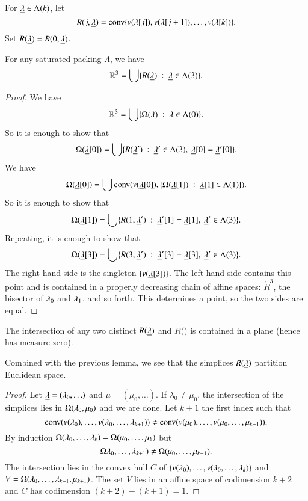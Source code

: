For ${\underline{\lambda}}\in\Lambda(k)$, let 
$$R(j,{\underline{\lambda}}) = {\operatorname{conv}}\{v(\lambda[j]), v(\lambda[j+1]),\ldots,v(\lambda[k])\}.$$  Set $R({\underline{\lambda}})=R(0,{\underline{\lambda}})$.


\begin{lemma} 
For any saturated packing $\Lambda$, we have
$$\mathbb{R}^3 = \bigcup \{ R({\underline{\lambda}}) \ :\  {\underline{\lambda}}\in \Lambda(3)\}.$$
\end{lemma}

\begin{proof}
We have $$\mathbb{R}^3 = \bigcup \{\Omega(\lambda)\ :\  \lambda\in \Lambda(0)\}.$$
So it is enough to show that
$$\Omega({\underline{\lambda}}[0]) = \bigcup \{ R({\underline{\lambda}}') \ :\  {\underline{\lambda}}'\in \Lambda(3),~{\underline{\lambda}}[0]={\underline{\lambda}}'[0]\}.$$
We have
$$\Omega({\underline{\lambda}}[0]) = \bigcup {\operatorname{conv}}(v({\underline{\lambda}}[0]),\{\Omega({\underline{\lambda}}[1])\ :\  {\underline{\lambda}}[1]\in \Lambda(1)\}).$$
So it is enough to show that
$$\Omega({\underline{\lambda}}[1]) = \bigcup \{ R(1,{\underline{\lambda}}') \ :\  {\underline{\lambda}}'[1]={\underline{\lambda}}[1],~{\underline{\lambda}}'\in \Lambda(3)\}.$$
Repeating, it is enough to show that
$$\Omega({\underline{\lambda}}[3]) = \bigcup\{R(3,{\underline{\lambda}}')\ :\ {\underline{\lambda}}'[3]={\underline{\lambda}}[3],~{\underline{\lambda}}'\in\Lambda(3)\}.$$
The right-hand side is the singleton $\{v({\underline{\lambda}}[3])\}$.  The left-hand side
contains this point and is contained in a properly decreasing chain of affine spaces:
$\ring{R}^3$, the bisector of $\lambda_0$ and $\lambda_1$, and so forth.  This determines a point,
so the two sides are equal.
\end{proof}

\begin{lemma}  The intersection of any two distinct $R({\underline{\lambda}})$ and $R(\bm)$ is
contained in a plane (hence has measure zero).
\end{lemma}

Combined with the previous lemma, we see that the simplices $R({\underline{\lambda}})$ partition Euclidean
space.

\begin{proof}  Let ${\underline{\lambda}} = (\lambda_0,\ldots)$ and $\mu = (\mu_0,\ldots)$.
If $\lambda_0\ne\mu_0$, the intersection of the simplices lies in $\Omega(\lambda_0,\mu_0)$
and we are done.  Let $k+1$ the first index such that
$${\operatorname{conv}}(v(\lambda_0),\ldots,v(\lambda_0,\ldots,\lambda_{k+1}))\ne
{\operatorname{conv}}(v(\mu_0),\ldots,v(\mu_0,\ldots,\mu_{k+1})).
$$
By induction $\Omega(\lambda_0,\ldots,\lambda_k) = \Omega(\mu_0,\ldots,\mu_k)$
but
$$\Omega\lambda_0,\ldots,\lambda_{k+1}) \ne \Omega(\mu_0,\ldots,\mu_{k+1}).$$
The intersection lies in the convex hull $C$ of
$\{v(\lambda_0),\ldots,v(\lambda_0,\ldots,\lambda_k)\}$ and
$V=\Omega(\lambda_0,\ldots,\lambda_{k+1},\mu_{k+1})$.  The set $V$ lies in an affine space of 
codimension $k+2$
and $C$ has codimension $(k+2) - (k+1) = 1$.
\end{proof}

